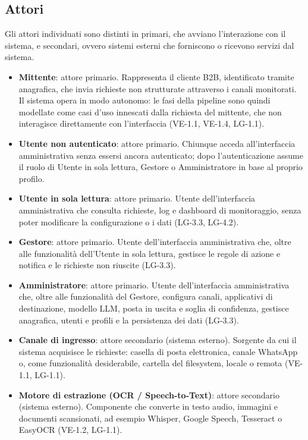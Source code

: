 \subsection{Attori}
Gli attori individuati sono distinti in primari, che avviano l'interazione con il sistema, e secondari, ovvero sistemi esterni che forniscono o ricevono servizi dal sistema.

\begin{itemize}
    \item \textbf{Mittente}: attore primario. Rappresenta il cliente B2B, identificato tramite anagrafica, che invia richieste non strutturate attraverso i canali monitorati. Il sistema opera in modo autonomo: le fasi della pipeline sono quindi modellate come casi d'uso innescati dalla richiesta del mittente, che non interagisce direttamente con l'interfaccia (VE-1.1, VE-1.4, LG-1.1).
    \item \textbf{Utente non autenticato}: attore primario. Chiunque acceda all'interfaccia amministrativa senza essersi ancora autenticato; dopo l'autenticazione assume il ruolo di Utente in sola lettura, Gestore o Amministratore in base al proprio profilo.
    \item \textbf{Utente in sola lettura}: attore primario. Utente dell'interfaccia amministrativa che consulta richieste, log e dashboard di monitoraggio, senza poter modificare la configurazione o i dati (LG-3.3, LG-4.2).
    \item \textbf{Gestore}: attore primario. Utente dell'interfaccia amministrativa che, oltre alle funzionalità dell'Utente in sola lettura, gestisce le regole di azione e notifica e le richieste non riuscite (LG-3.3).
    \item \textbf{Amministratore}: attore primario. Utente dell'interfaccia amministrativa che, oltre alle funzionalità del Gestore, configura canali, applicativi di destinazione, modello LLM, posta in uscita e soglia di confidenza, gestisce anagrafica, utenti e profili e la persistenza dei dati (LG-3.3).
    \item \textbf{Canale di ingresso}: attore secondario (sistema esterno). Sorgente da cui il sistema acquisisce le richieste: casella di posta elettronica, canale WhatsApp o, come funzionalità desiderabile, cartella del filesystem, locale o remota (VE-1.1, LG-1.1).
    \item \textbf{Motore di estrazione (OCR / Speech-to-Text)}: attore secondario (sistema esterno). Componente che converte in testo audio, immagini e documenti scansionati, ad esempio Whisper, Google Speech, Tesseract o EasyOCR (VE-1.2, LG-1.1).

\end{itemize}
